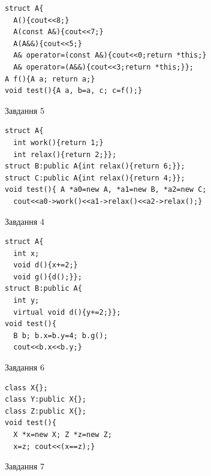 \documentclass[12pt, ukrainian]{article}
\begin{document}
{{{{{{{{{{{\begin{minipage}[t]{11cm}
\begin{verbatim}
struct A{
  A(){cout<<8;}
  A(const A&){cout<<7;}
  A(A&&){cout<<5;}
  A& operator=(const A&){cout<<0;return *this;}
  A& operator=(A&&){cout<<3;return *this;}};
A f(){A a; return a;}
void test(){A a, b=a, c; c=f();}
\end{verbatim}            


               
{\begin{center}Завдання {5}\end{center}}
\vspace{-6mm}

\begin{verbatim}
struct A{
  int work(){return 1;}
  int relax(){return 2;}};
struct B:public A{int relax(){return 6;}};
struct C:public A{int relax(){return 4;}};
void test(){ A *a0=new A, *a1=new B, *a2=new C;
  cout<<a0->work()<<a1->relax()<<a2->relax();}
\end{verbatim}            


\end{minipage}
\vline \hspace{8mm}
\begin{minipage}[t]{7cm}
               
{\begin{center}Завдання {4}\end{center}}
\vspace{-6mm}

\begin{verbatim}
struct A{
  int x;
  void d(){x+=2;}
  void g(){d();}};
struct B:public A{
  int y;
  virtual void d(){y+=2;}};
void test(){
  B b; b.x=b.y=4; b.g();
  cout<<b.x<<b.y;}
\end{verbatim}            


               
{\begin{center}Завдання {6}\end{center}}
\vspace{-6mm}

\begin{verbatim}
class X{};
class Y:public X{};
class Z:public X{};
void test(){
  X *x=new X; Z *z=new Z;
  x=z; cout<<(x==z);}
\end{verbatim}            


               
{\begin{center}Завдання {7}\end{center}}
\vspace{-6mm}


\end{minipage}}}}}}}}}}}}
\end{document}

